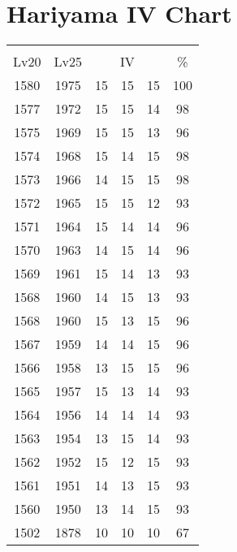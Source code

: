 \documentclass{article}%
\begin{document}
%
\normalsize%
\section{Hariyama IV Chart}%
\label{sec:Hariyama IV Chart}%
\renewcommand{\arraystretch}{1.5}%
\begin{tabular}{|c|c|c|c|c|c|}%
\hline%
\multicolumn{6}{|c|}{\textcolor{white}{ 
\linebreak{Hariyama}
}%
\cellcolor{black}}\\%
\multicolumn{1}{|c}{Lv20}&\multicolumn{1}{c|}{Lv25}&\multicolumn{3}{c|}{IV}&\multicolumn{1}{|c|}{\%}\\%
\hline%
\rowcolor{color100}%
1580&1975&15&15&15&100\\%
\hline%
\rowcolor{color98}%
1577&1972&15&15&14&98\\%
\hline%
\rowcolor{color96}%
1575&1969&15&15&13&96\\%
\hline%
\rowcolor{color98}%
1574&1968&15&14&15&98\\%
\hline%
\rowcolor{color98}%
1573&1966&14&15&15&98\\%
\hline%
\rowcolor{color93}%
1572&1965&15&15&12&93\\%
\hline%
\rowcolor{color96}%
1571&1964&15&14&14&96\\%
\hline%
\rowcolor{color96}%
1570&1963&14&15&14&96\\%
\hline%
\rowcolor{color93}%
1569&1961&15&14&13&93\\%
\hline%
\rowcolor{color93}%
1568&1960&14&15&13&93\\%
\hline%
\rowcolor{color96}%
1568&1960&15&13&15&96\\%
\hline%
\rowcolor{color96}%
1567&1959&14&14&15&96\\%
\hline%
\rowcolor{color96}%
1566&1958&13&15&15&96\\%
\hline%
\rowcolor{color93}%
1565&1957&15&13&14&93\\%
\hline%
\rowcolor{color93}%
1564&1956&14&14&14&93\\%
\hline%
\rowcolor{color93}%
1563&1954&13&15&14&93\\%
\hline%
\rowcolor{color93}%
1562&1952&15&12&15&93\\%
\hline%
\rowcolor{color93}%
1561&1951&14&13&15&93\\%
\hline%
\rowcolor{color93}%
1560&1950&13&14&15&93\\%
\hline%
\rowcolor{color91}%
1502&1878&10&10&10&67\\%
\end{tabular}

%
\end{document}

